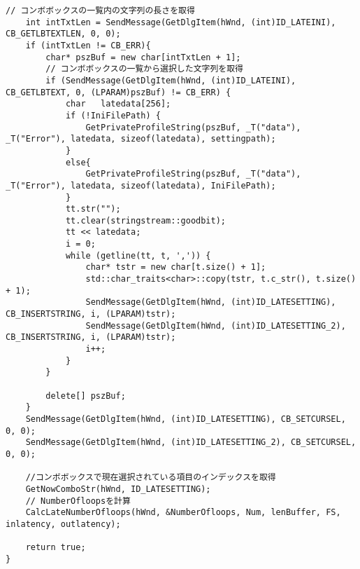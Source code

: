 \begin{lstlisting}[caption=window.cpp]
	// コンボボックスの一覧内の文字列の長さを取得
	int intTxtLen = SendMessage(GetDlgItem(hWnd, (int)ID_LATEINI), CB_GETLBTEXTLEN, 0, 0);
	if (intTxtLen != CB_ERR){
		char* pszBuf = new char[intTxtLen + 1];
		// コンボボックスの一覧から選択した文字列を取得
		if (SendMessage(GetDlgItem(hWnd, (int)ID_LATEINI), CB_GETLBTEXT, 0, (LPARAM)pszBuf) != CB_ERR) {
			char   latedata[256];
			if (!IniFilePath) {
				GetPrivateProfileString(pszBuf, _T("data"), _T("Error"), latedata, sizeof(latedata), settingpath);
			}
			else{
				GetPrivateProfileString(pszBuf, _T("data"), _T("Error"), latedata, sizeof(latedata), IniFilePath);
			}
			tt.str("");
			tt.clear(stringstream::goodbit);
			tt << latedata;
			i = 0;
			while (getline(tt, t, ',')) {
				char* tstr = new char[t.size() + 1];
				std::char_traits<char>::copy(tstr, t.c_str(), t.size() + 1);
				SendMessage(GetDlgItem(hWnd, (int)ID_LATESETTING), CB_INSERTSTRING, i, (LPARAM)tstr);
				SendMessage(GetDlgItem(hWnd, (int)ID_LATESETTING_2), CB_INSERTSTRING, i, (LPARAM)tstr);
				i++;
			}
		}

		delete[] pszBuf;
	}
	SendMessage(GetDlgItem(hWnd, (int)ID_LATESETTING), CB_SETCURSEL, 0, 0);
	SendMessage(GetDlgItem(hWnd, (int)ID_LATESETTING_2), CB_SETCURSEL, 0, 0);

	//コンボボックスで現在選択されている項目のインデックスを取得
	GetNowComboStr(hWnd, ID_LATESETTING);
	// NumberOfloopsを計算
	CalcLateNumberOfloops(hWnd, &NumberOfloops, Num, lenBuffer, FS, inlatency, outlatency);

	return true;
}
\end{lstlisting}

